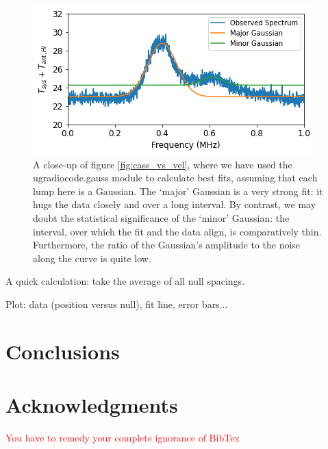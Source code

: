\documentclass[12pt]{article}
\begin{document}
\begin{figure}
\centering
	\includegraphics[width=.6\linewidth]{gauss}
	\caption{A close-up of figure \ref{fig:cass_vs_vel}, where we have used the ugradiocode.gauss module to calculate best fits, assuming that each lump here is a Gaussian. The `major' Gaussian is a very strong fit: it hugs the data closely and over a long interval. By contrast, we may doubt the statistical significance of the `minor' Gaussian: the interval, over which the fit and the data align, is comparatively thin. Furthermore, the ratio of the Gaussian's amplitude to the noise along the curve is quite low.}
	\label{fig:gauss}
\end{figure}

A quick calculation: take the average of all null spacings.

Plot: data (position versus null), fit line, error bars...

\section{Conclusions}

\quad \quad 


\section{Acknowledgments}

\quad \quad \textcolor{red}{You have to remedy your complete ignorance of BibTex}
\end{document}
